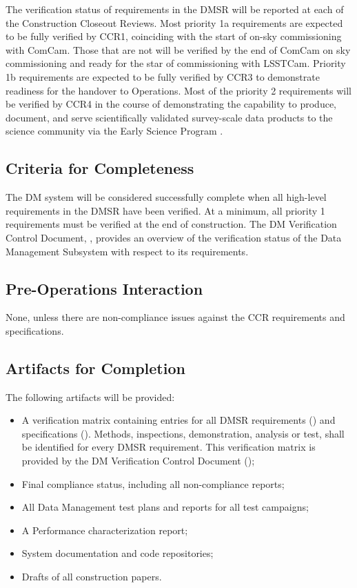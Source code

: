The verification status of requirements in the DMSR will be reported at each of the Construction Closeout Reviews.
Most priority 1a requirements are expected to be fully verified by CCR1, coinciding with the start of on-sky commissioning with ComCam. Those that are not will be verified by the end of ComCam on sky commissioning and ready for the star of commissioning with LSSTCam.
Priority 1b requirements are expected to be fully verified by CCR3 to demonstrate readiness for the handover to Operations.
Most of the priority 2 requirements will be verified by CCR4 in the course of demonstrating the capability to produce, document, and serve scientifically validated survey-scale data products to the science community via the Early Science Program .

\subsection{Criteria for Completeness} \label{sec:dm-completeness}
The DM system will be considered successfully complete when all high-level requirements in the DMSR have been verified.
At a minimum, all priority 1 requirements must be verified at the end of construction.
The DM Verification Control Document, ,  provides an overview of the verification status of the Data Management Subsystem with respect to its requirements.

\subsection{Pre-Operations Interaction}
None, unless there are non-compliance issues against the CCR requirements and specifications.

\subsection{Artifacts for Completion} \label{sec:dm-artifacts}
The following artifacts will be provided:
\begin{itemize}
	\item A verification matrix containing entries for all DMSR requirements () and specifications (). Methods, inspections, demonstration, analysis or test, shall be identified for every DMSR requirement. This verification matrix is provided by the DM Verification Control Document ();
	\item Final compliance status, including all non-compliance reports;
	\item All Data Management test plans and reports for all test campaigns;
	\item A Performance characterization report;
	\item System documentation and code repositories;
	\item Drafts of all construction papers.
\end{itemize}

